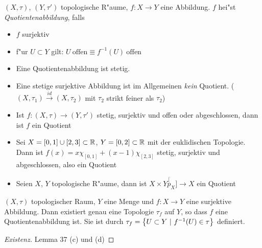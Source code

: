 \documentclass{skript}
\begin{document}
\begin{dfn}
    $(X,\tau)$, $(Y, \tau')$ topologische R"aume, $f: X\to Y$ eine Abbildung.
    $f$ hei"st \emph{Quotientenabbildung}, falls
    \begin{itemize}
        \item $f$ surjektiv
        \item f"ur $U \subset Y$ gilt: $U\ \text{offen} \Equiv f^{-1}(U)\
            \mathrm{offen}$
    \end{itemize}

    \begin{bem}
        \begin{itemize}
            \item Eine Quotientenabbildung ist stetig.
            \item Eine stetige surjektive Abbildung ist im Allgemeinen
                \emph{kein} Quotient. ($(X, \tau_1) \overset{id} \to
                (X,\tau_2)$ mit $\tau_2$ strikt feiner als $\tau_2$)
        \end{itemize}
    \end{bem}

    \begin{bsps}
        \begin{itemize}
            \item Ist $f:(X,\tau)\to (Y,\tau')$ stetig, surjektiv und offen
                oder abgeschlossen, dann ist $f$ ein Quotient
            \item Sei $X=[0,1]\cup [2,3] \subset \mathbb{R}$, $Y=[0,2]\subset \mathbb{R}$ mit
                der euklidischen Topologie. Dann ist $f(x)=x\chi_{[0,1]} +
                (x-1)\chi_{[2,3]}$ stetig, surjektiv und abgeschlossen, also
                ein Quotient
            \item Seien $X$, $Y$ topologische R"aume, dann ist $X\times Y
                \overset[p_X]{\to} X$ ein Quotient
        \end{itemize}
    \end{bsps}
\end{dfn}

\begin{dfn}
    $(X,\tau)$ topologischer Raum, $Y$ eine Menge und $f:X\to Y$ eine
    surjektive Abbildung. Dann existiert genau eine Topologie $\tau_f$ auf $Y$,
    so dass $f$ eine Quotientenabbildung ist. Sie ist durch $\tau_f =
    \mdef[U\subset Y]{f^{-1}(U)\in \tau}$ definiert.
    \begin{proof}[Existenz]
        Lemma 37 (c) und (d)
    \end{proof}
\end{dfn}
\end{document}
